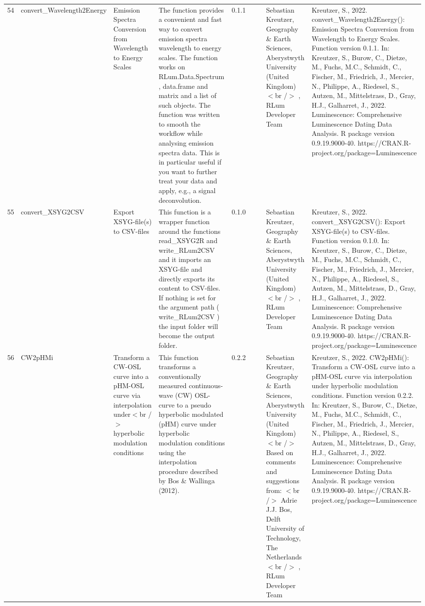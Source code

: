 \begin{table}[ht]
\begin{tabular}{rllllllll}
 \\ 
  54 & convert\_Wavelength2Energy & Emission Spectra Conversion from Wavelength to Energy Scales & The function provides a convenient and fast way to convert emission spectra wavelength to energy scales. The function works on  RLum.Data.Spectrum ,  data.frame  and  matrix  and a  list  of such objects. The function was written to smooth the workflow while analysing emission spectra data. This is in particular useful if you want to further treat your data and apply, e.g., a signal deconvolution. & 0.1.1
 &  &  & Sebastian Kreutzer, Geography \& Earth Sciences, Aberystwyth University (United Kingdom)$<$br /$>$ , RLum Developer Team & Kreutzer, S., 2022. convert\_Wavelength2Energy(): Emission Spectra Conversion from Wavelength to Energy Scales. Function version 0.1.1. In: Kreutzer, S., Burow, C., Dietze, M., Fuchs, M.C., Schmidt, C., Fischer, M., Friedrich, J., Mercier, N., Philippe, A., Riedesel, S., Autzen, M., Mittelstrass, D., Gray, H.J., Galharret, J., 2022. Luminescence: Comprehensive Luminescence Dating Data Analysis. R package version 0.9.19.9000-40. https://CRAN.R-project.org/package=Luminescence
 \\ 
  55 & convert\_XSYG2CSV & Export XSYG-file(s) to CSV-files & This function is a wrapper function around the functions  read\_XSYG2R  and write\_RLum2CSV  and it imports an XSYG-file and directly exports its content to CSV-files. If nothing is set for the argument  path  ( write\_RLum2CSV ) the input folder will become the output folder. & 0.1.0
 &  &  & Sebastian Kreutzer, Geography \& Earth Sciences, Aberystwyth University (United Kingdom)$<$br /$>$ , RLum Developer Team & Kreutzer, S., 2022. convert\_XSYG2CSV(): Export XSYG-file(s) to CSV-files. Function version 0.1.0. In: Kreutzer, S., Burow, C., Dietze, M., Fuchs, M.C., Schmidt, C., Fischer, M., Friedrich, J., Mercier, N., Philippe, A., Riedesel, S., Autzen, M., Mittelstrass, D., Gray, H.J., Galharret, J., 2022. Luminescence: Comprehensive Luminescence Dating Data Analysis. R package version 0.9.19.9000-40. https://CRAN.R-project.org/package=Luminescence
 \\ 
  56 & CW2pHMi & Transform a CW-OSL curve into a pHM-OSL curve via interpolation under$<$br /$>$ hyperbolic modulation conditions & This function transforms a conventionally measured continuous-wave (CW) OSL-curve to a pseudo hyperbolic modulated (pHM) curve under hyperbolic modulation conditions using the interpolation procedure described by Bos \& Wallinga (2012). & 0.2.2
 &  &  & Sebastian Kreutzer, Geography \& Earth Sciences, Aberystwyth University (United Kingdom) $<$br /$>$ Based on comments and suggestions from: $<$br /$>$ Adrie J.J. Bos, Delft University of Technology, The Netherlands$<$br /$>$ , RLum Developer Team & Kreutzer, S., 2022. CW2pHMi(): Transform a CW-OSL curve into a pHM-OSL curve via interpolation under hyperbolic modulation conditions. Function version 0.2.2. In: Kreutzer, S., Burow, C., Dietze, M., Fuchs, M.C., Schmidt, C., Fischer, M., Friedrich, J., Mercier, N., Philippe, A., Riedesel, S., Autzen, M., Mittelstrass, D., Gray, H.J., Galharret, J., 2022. Luminescence: Comprehensive Luminescence Dating Data Analysis. R package version 0.9.19.9000-40. https://CRAN.R-project.org/package=Luminescence

\end{tabular}
\end{table}
